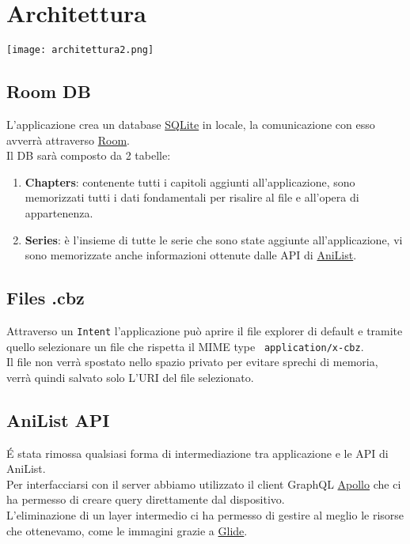 \documentclass[../Assignment-3-LPSMT.tex]{subfiles}
\begin{document}
\chapter{Architettura}

\begin{center}
  \texttt{[image: architettura2.png]}
\end{center}

\section{Room DB}

L'applicazione crea un database \href{https://www.sqlite.org/index.html}{SQLite} in locale, la comunicazione con esso avverrà attraverso \href{https://developer.android.com/reference/androidx/room/package-summary}{Room}.\\
Il DB sarà composto da 2 tabelle:
\begin{enumerate}
  \item \textbf{Chapters}: contenente tutti i capitoli aggiunti all'applicazione, sono memorizzati tutti i dati fondamentali per risalire al file e all'opera di appartenenza.\\
  \item \textbf{Series}: è l'insieme di tutte le serie che sono state aggiunte all'applicazione, vi sono memorizzate anche informazioni ottenute dalle API di \href{https://anilist.gitbook.io/anilist-apiv2-docs/}{AniList}.
\end{enumerate}

\section{Files .cbz}

Attraverso un \texttt{Intent} l'applicazione può aprire il file explorer di default e tramite quello selezionare un file che rispetta il MIME type~\cite{rfc6838} \texttt{application/x-cbz}.\\
Il file non verrà spostato nello spazio privato per evitare sprechi di memoria, verrà quindi salvato solo L'URI del file selezionato.

\section{AniList API}

\'E stata rimossa qualsiasi forma di intermediazione tra applicazione e le API di AniList.\\
Per interfacciarsi con il server abbiamo utilizzato il client GraphQL \href{https://www.apollographql.com/docs/kotlin}{Apollo} che ci ha permesso di creare query direttamente dal dispositivo.\\
L'eliminazione di un layer intermedio ci ha permesso di gestire al meglio le risorse che ottenevamo, come le immagini grazie a \href{https://bumptech.github.io/glide/}{Glide}.
\end{document}
